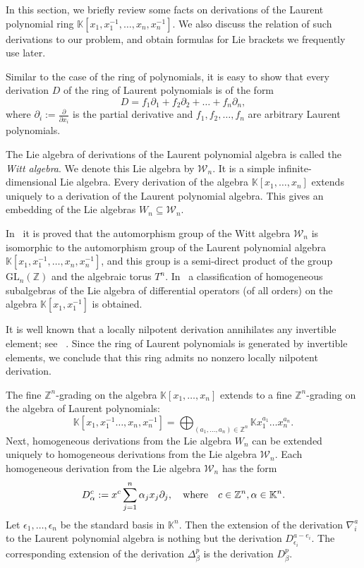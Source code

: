 \documentclass[a4paper, 12pt,oneside,reqno]{amsart}
\numberwithin{equation}{section}
\theoremstyle{definition}
\begin{document}
In this section, we briefly review some facts on derivations of the Laurent polynomial ring $\mathbb{K}[x_1,x_1^{-1},\ldots,x_n,x_n^{-1}].$ We also discuss the relation of such derivations to our problem, and obtain formulas for Lie brackets we frequently use later. 

Similar to the case of the ring of polynomials, it is easy to show that every derivation $D$ of the ring of Laurent polynomials is of the form
$$
D=f_1\partial_1+f_2\partial_2+\ldots+f_n\partial_n,
$$
where $\partial_i:=\frac{\partial}{\partial x_i}$ is the partial derivative and $f_1,f_2,\ldots,f_n$ are arbitrary Laurent polynomials. 

The Lie algebra of derivations of the Laurent polynomial algebra is called the {\it Witt algebra}. We denote this Lie algebra by $\mathcal{W}_n$. It is a simple infinite-dimensional Lie algebra. Every derivation of the algebra $\mathbb{K}[x_1,\ldots,x_n]$ extends uniquely to a derivation of the Laurent polynomial algebra. This gives an embedding of the Lie algebras $W_n\subseteq\mathcal{W}_n$. 

In~\cite{Ba-1} it is proved that the automorphism group of the Witt algebra $\mathcal{W}_n$ is isomorphic to the automorphism group of the Laurent polynomial algebra $\mathbb{K}[x_1, x_1^{-1},\ldots,x_n,x_n^{-1}]$, and this group is a semi-direct product of the group $\mathrm{GL}_n(\mathbb{Z})$ and the algebraic torus $T^n$. In~\cite{Ch} a classification of homogeneous subalgebras of the Lie algebra of differential operators (of all orders) on the algebra $\mathbb{K}[x_1,x_1^{-1}]$ is obtained. 

It is well known that a locally nilpotent derivation annihilates any invertible element; see ~\cite[Principle~1~(b)]{Fr}. Since the ring of Laurent polynomials is generated by invertible elements, we conclude that this ring admits no nonzero locally nilpotent derivation. 

The fine $\mathbb{Z}^n$-grading on the algebra $\mathbb{K}[x_1,\ldots,x_n]$ extends to a fine $\mathbb{Z}^n$-grading on the algebra of Laurent polynomials:
$$
\mathbb{K}[x_1,x_1^{-1}\ldots,x_n,x_n^{-1}]=\bigoplus_{(a_1,\ldots,a_n)\in\mathbb{Z}^n} \mathbb{K} x_1^{a_1}\ldots x_n^{a_n}. 
$$ 
Next, homogeneous derivations from the Lie algebra $W_n$ can be extended uniquely to homogeneous derivations from the Lie algebra $\mathcal{W}_n$. Each homogeneous derivation from the Lie algebra $\mathcal{W}_n$ has the form
$$
D^c_{\alpha}:=x^c\sum_{j=1}^n \alpha_jx_j\partial_j, \quad \text{where} \quad c\in\mathbb{Z}^n, \\ \alpha\in\mathbb{K}^n. 
$$
Let $\epsilon_1,\ldots,\epsilon_n$ be the standard basis in $\mathbb{K}^n$. Then the extension of the derivation $\nabla^a_i$ to the Laurent polynomial algebra is nothing but the derivation $D^{a-e_i}_{\epsilon_i}$. The corresponding extension of the derivation $\Delta^p_{\beta}$ is the derivation $D^p_{\beta}$.  
\end{document}
